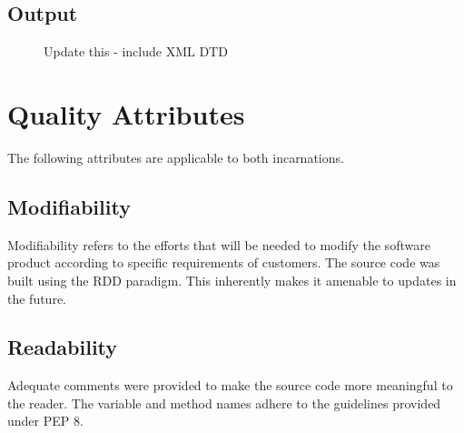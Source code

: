     \subsection{Output}
    \begin{figure}[h!]
      \centering
      \caption{Update this - include XML DTD}
      \label{fig:XML output}
    \end{figure}

\section{Quality Attributes}
  \begin{flushleft}
    The following attributes are applicable to both incarnations.
  \end{flushleft}
  \subsection{Modifiability}
    \begin{flushleft}
      Modifiability refers to the efforts that will be needed to modify the software product according to specific requirements of customers\cite{8343604}. The source code was built using the RDD paradigm. This inherently makes it amenable to updates in the future.
    \end{flushleft}

  \subsection{Readability}
    \begin{flushleft}
      Adequate comments were provided to make the source code more meaningful to the reader. The variable and method names adhere to the guidelines provided under PEP 8. 
    \end{flushleft}

